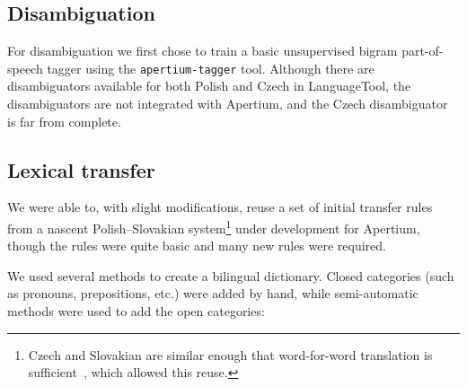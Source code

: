 \documentclass[11pt]{article}
\begin{document}
\subsection{Disambiguation}

For disambiguation we first chose to train a basic unsupervised bigram
part-of-speech tagger using the {\tt\small apertium-tagger} tool.
Although there are disambiguators available for both Polish and
Czech in LanguageTool, the disambiguators are not integrated with 
Apertium, and the Czech disambiguator is far from complete.

\subsection{Lexical transfer}

We were able to, with slight modifications, reuse a set of initial
transfer rules from a nascent Polish--Slovakian system\footnote{Czech 
and Slovakian are similar enough that word-for-word translation is sufficient~\citep{Hajic00},
which allowed this reuse.} under
development for Apertium, though the rules were quite basic
and many new rules were required.

We used several methods to create a bilingual dictionary. Closed 
categories (such as pronouns, prepositions, etc.) were added by
hand, while semi-automatic methods were used to add the open 
categories:
\end{document}
